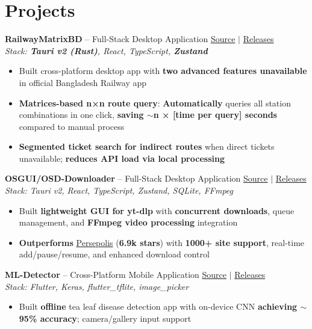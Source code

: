 \documentclass[10pt,a4paper]{article}
\begin{document}
\section{Projects}
\textbf{RailwayMatrixBD} -- Full-Stack Desktop Application \hfill \href{https://github.com/AhmedTrooper/RailwayMatrixBD}{Source} $|$ \href{https://github.com/AhmedTrooper/RailwayMatrixBD/releases}{Releases} \\
\textit{Stack: \textbf{Tauri v2 (Rust)}, React, TypeScript, \textbf{Zustand}} \\[-6pt]
\begin{itemize}[leftmargin=12pt, itemsep=0pt, topsep=2pt]
    \item Built cross-platform desktop app with \textbf{two advanced features unavailable} in official Bangladesh Railway app
    \item \textbf{Matrices-based n×n route query}: \textbf{Automatically} queries all station combinations in one click, \textbf{saving $\sim$n × [time per query] seconds} compared to manual process
    \item \textbf{Segmented ticket search for indirect routes} when direct tickets unavailable; \textbf{reduces API load via local processing}
\end{itemize}

\textbf{OSGUI/OSD-Downloader} -- Full-Stack Desktop Application \hfill \href{https://github.com/AhmedTrooper/OSD-Downloader}{Source} $|$ \href{https://github.com/AhmedTrooper/OSD-Downloader/releases}{Releases} \\
\textit{Stack: Tauri v2, React, TypeScript, Zustand, SQLite, FFmpeg} \\[-6pt]
\begin{itemize}[leftmargin=12pt, itemsep=0pt, topsep=2pt]
    \item Built \textbf{lightweight GUI for yt-dlp} with \textbf{concurrent downloads}, queue management, and \textbf{FFmpeg video processing} integration
    \item \textbf{Outperforms} \href{https://github.com/persepolisdm/persepolis}{Persepolis} (\textbf{6.9k stars}) with \textbf{1000+ site support}, real-time add/pause/resume, and enhanced download control
\end{itemize}

\textbf{ML-Detector} -- Cross-Platform Mobile Application \hfill \href{https://github.com/AhmedTrooper/ML-Detector}{Source} $|$ \href{https://github.com/AhmedTrooper/ML-Detector/releases}{Releases} \\
\textit{Stack: Flutter, Keras, flutter\_tflite, image\_picker} \\[-6pt]
\begin{itemize}[leftmargin=12pt, itemsep=0pt, topsep=2pt]
    \item Built \textbf{offline} tea leaf disease detection app with on-device CNN \textbf{achieving $\sim$95\% accuracy}; camera/gallery input support
\end{itemize}
\end{document}
